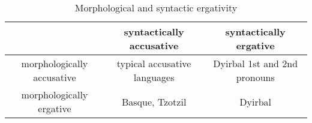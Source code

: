 \begin{table}
    \caption{Morphological and syntactic ergativity}
    \label{tbl:morphological-syntactic-ergativity}
    \centering
    \begin{tabular}{ccc}
    
    \toprule
                               & syntactically accusative     & syntactically ergative       \\ \midrule
    morphologically accusative & typical accusative languages & Dyirbal 1st and 2nd pronouns \\
    morphologically ergative   & Basque, Tzotzil              & Dyirbal                      \\ \bottomrule
    \end{tabular}
\end{table}